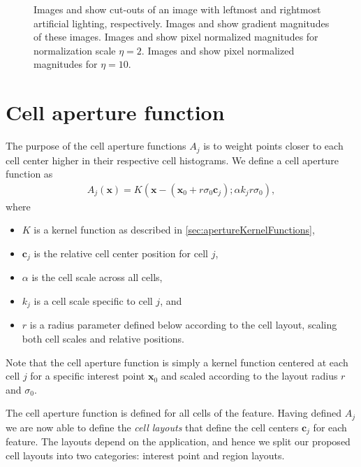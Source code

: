 \documentclass[thesis.tex]{subfiles}
\def\x{\mathbf{x}}
\def\c{\mathbf{c}}
\begin{document}
\begin{figure}[p]
\begin{subfigure}[t]{0.48\textwidth}
        \caption{}
        \label{fig:pixelNormalizationExample8}
    \end{subfigure}
    \caption{Images  and  show cut-outs of an image with leftmost and rightmost artificial lighting, respectively. Images  and  show gradient magnitudes of these images. Images  and  show pixel normalized magnitudes for normalization scale $\eta = 2$. Images  and  show pixel normalized magnitudes for $\eta = 10$.}
    \label{fig:pixelNormalizationExample}
\end{figure}
%
\section{Cell aperture function}
\label{sec:cellApertureFunction}
%
The purpose of the cell aperture functions $A_j$ is to weight points closer to each cell center higher in their respective cell histograms. We define a cell aperture function as
%
\begin{align}
A_j(\x) = K(\x - (\x_0 + r \sigma_0 \c_j); \alpha k_j r \sigma_0),
\end{align}
%
where
%
\begin{itemize}
\item[] $K$ is a kernel function as described in \ref{sec:apertureKernelFunctions},
\item[] $\c_j$ is the relative cell center position for cell $j$,
\item[] $\alpha$ is the cell scale across all cells,
\item[] $k_j$ is a cell scale specific to cell $j$, and
\item[] $r$ is a radius parameter defined below according to the cell layout, scaling both cell scales and relative positions.
\end{itemize}
%
Note that the cell aperture function is simply a kernel function centered at each cell $j$ for a specific interest point $\x_0$ and scaled according to the layout radius $r$ and $\sigma_0$.

The cell aperture function is defined for all cells of the feature. Having defined $A_j$ we are now able to define the \emph{cell layouts} that define the cell centers $\c_j$ for each feature. The layouts depend on the application, and hence we split our proposed cell layouts into two categories: interest point and region layouts.
\end{document}
